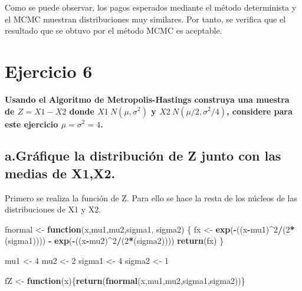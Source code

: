 \documentclass[
]{article}
\newenvironment{Shaded}{\begin{snugshade}}{\end{snugshade}}
\newcommand{\ControlFlowTok}[1]{\textcolor[rgb]{0.13,0.29,0.53}{\textbf{#1}}}
\newcommand{\DecValTok}[1]{\textcolor[rgb]{0.00,0.00,0.81}{#1}}
\newcommand{\FunctionTok}[1]{\textcolor[rgb]{0.13,0.29,0.53}{\textbf{#1}}}
\newcommand{\NormalTok}[1]{#1}
\newcommand{\OtherTok}[1]{\textcolor[rgb]{0.56,0.35,0.01}{#1}}
\newcommand{\SpecialCharTok}[1]{\textcolor[rgb]{0.81,0.36,0.00}{\textbf{#1}}}
\begin{document}
Como se puede observar, los pagos esperados mediante el método
determinista y el MCMC muestran distribuciones muy similares. Por tanto,
se verifica que el resultado que se obtuvo por el método MCMC es
aceptable.

\hypertarget{ejercicio-6}{%
\section{Ejercicio 6}\label{ejercicio-6}}

\textbf{Usando el Algoritmo de Metropolis-Hastings construya una muestra
de \(𝑍=𝑋1−𝑋2\) donde \(𝑋1~𝑁(𝜇,𝜎^2)\) y \(𝑋2~𝑁(𝜇/2,𝜎^2/4)\), considere
para este ejercicio \(𝜇=𝜎^2=4\).}

\hypertarget{a.gruxe1fique-la-distribuciuxf3n-de-z-junto-con-las-medias-de-x1x2.}{%
\subsection{a.Gráfique la distribución de Z junto con las medias de
X1,X2.}\label{a.gruxe1fique-la-distribuciuxf3n-de-z-junto-con-las-medias-de-x1x2.}}

Primero se realiza la función de Z. Para ello se hace la resta de los
núcleos de las distribuciones de X1 y X2.

\begin{Shaded}
\begin{Highlighting}[]
\NormalTok{fnormal }\OtherTok{\textless{}{-}} \ControlFlowTok{function}\NormalTok{(x,mu1,mu2,sigma1, sigma2) \{ }
\NormalTok{  fx }\OtherTok{\textless{}{-}} \FunctionTok{exp}\NormalTok{(}\SpecialCharTok{{-}}\NormalTok{((x}\SpecialCharTok{{-}}\NormalTok{mu1)}\SpecialCharTok{\^{}}\DecValTok{2}\SpecialCharTok{/}\NormalTok{(}\DecValTok{2}\SpecialCharTok{*}\NormalTok{(sigma1)))) }\SpecialCharTok{{-}} \FunctionTok{exp}\NormalTok{(}\SpecialCharTok{{-}}\NormalTok{((x}\SpecialCharTok{{-}}\NormalTok{mu2)}\SpecialCharTok{\^{}}\DecValTok{2}\SpecialCharTok{/}\NormalTok{(}\DecValTok{2}\SpecialCharTok{*}\NormalTok{(sigma2)))) }
  \FunctionTok{return}\NormalTok{(fx) }
\NormalTok{\}}

\NormalTok{mu1 }\OtherTok{\textless{}{-}} \DecValTok{4}
\NormalTok{mu2 }\OtherTok{\textless{}{-}} \DecValTok{2}
\NormalTok{sigma1 }\OtherTok{\textless{}{-}} \DecValTok{4}
\NormalTok{sigma2 }\OtherTok{\textless{}{-}} \DecValTok{1}

\NormalTok{fZ }\OtherTok{\textless{}{-}} \ControlFlowTok{function}\NormalTok{(x)\{}\FunctionTok{return}\NormalTok{(}\FunctionTok{fnormal}\NormalTok{(x,mu1,mu2,sigma1,sigma2))\}}
\end{Highlighting}
\end{Shaded}
\end{document}
